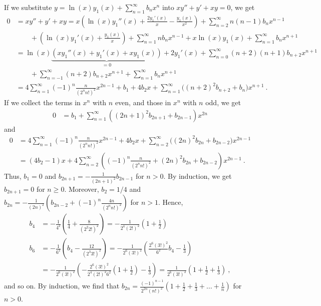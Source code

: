 \begin{egg}
If we substitute
$\displaystyle y = \ln(x)y_1(x) + \sum_{n=1}^\infty b_n x^n$ into
$\displaystyle xy''+ y' + xy = 0$, we get
\begin{align*}
0 & = xy''+ y' + xy
= x\left( \ln(x) y_1''(x) + \frac{2y_1'(x)}{x}- \frac{y_1(x)}{x^2}\right)
+ \sum_{n=2}^\infty n(n-1) b_n x^{n-1}\\
&\qquad + \left( \ln(x) y_1'(x) + \frac{y_1(x)}{x}\right) 
+ \sum_{n=1}^\infty n b_n x^{n-1} + x \ln(x) y_1(x)
+ \sum_{n=1}^\infty b_n x^{n+1} \\
&= \ln(x) \underbrace{\left( x y_1''(x) + y_1'(x) + x y_1(x)\right)}_{=0}
+2 y_1'(x) + \sum_{n=0}^\infty (n+2)(n+1) b_{n+2} x^{n+1} \\
&\qquad + \sum_{n=-1}^\infty (n+2) b_{n+2} x^{n+1}
+ \sum_{n=1}^\infty b_n x^{n+1} \\
&=4\sum_{n=1}^\infty (-1)^n \frac{n}{ (2^n n!)^2}x^{2n-1} + b_1 + 4 b_2x
+ \sum_{n=1}^\infty \big( (n+2)^2 b_{n+2} + b_n\big) x^{n+1} \ .
\end{align*}
If we collect the terms in $x^n$ with $n$ even, and those in $x^n$ with
$n$ odd, we get
\begin{align*}
0 &= b_1 + \sum_{n=1}^\infty \left((2n+1)^2 b_{2n+1}+b_{2n-1}\right) x^{2n}
\end{align*}
and
\begin{align*}
0 &= 4\sum_{n=1}^\infty (-1)^n \frac{n}{ (2^n n!)^2}x^{2n-1} + 4b_2 x 
+ \sum_{n=2}^\infty \big( (2n)^2 b_{2n} + b_{2n-2}\big) x^{2n-1} \\
&= (4b_2-1)x + 4\sum_{n=2}^\infty\left((-1)^n \frac{n}{(2^n n!)^2}
+ (2n)^2 b_{2n} + b_{2n-2}\right) x^{2n-1} \  .
\end{align*}
Thus, $b_1=0$ and
$\displaystyle b_{2n+1} = - \frac{1}{(2n+1)^2}b_{2n-1}$
for $n >0$.  By induction, we get $b_{2n+1} = 0$ for $n \geq 0$.
Moreover, $b_2 = 1/4$ and
$\displaystyle b_{2n} = -\frac{1}{(2n)^2} \left( b_{2n-2} +
 (-1)^n \frac{4n}{(2^n n!)^2}\right)$
for $n>1$.  Hence,
\begin{align*}
b_4 &= -\frac{1}{4^2} \left( \frac{1}{4} + \frac{8}{(2^2 2!)^2}\right)
= -\frac{1}{2^4 (2!)^2}\left( 1 + \frac{1}{2} \right) \\
b_6 &= -\frac{1}{6^2} \left( b_4 - \frac{12}{(2^3 3!)^2}\right)
= -\frac{1}{2^6 (3!)^2} \left( \frac{2^6(3!)^2}{6^2}b_4 -\frac{1}{3}\right) \\
&= -\frac{1}{2^6 (3!)^2} \left( 
-\frac{2^6(3!)^2}{2^4 (2!)^2 6^2}\left( 1 + \frac{1}{2} \right)
-\frac{1}{3}\right)
= \frac{1}{2^6 (3!)^2} \left( 1 + \frac{1}{2} + \frac{1}{3}\right) \ ,
\end{align*}
and so on.  By induction, we find that
$\displaystyle b_{2n} = \frac{(-1)^{n-1}}{2^{2n}(n!)^2}\left(1+\frac{1}{2}
  +\frac{1}{3} + \ldots + \frac{1}{n}\right)$
for $n > 0$.


\end{egg}
